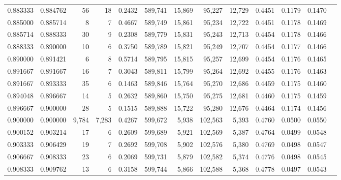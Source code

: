 \begin{tabular}{rrrrrrrrrrrrr}
0.883333 & 0.884762 &     56 &     18 &                                     0.2432 & 589,741 &  15,869 &  95,227 &  12,729 & 0.4451 & 0.1179 & 0.1470 \\
0.885000 & 0.885714 &      8 &      7 &                                     0.4667 & 589,749 &  15,861 &  95,234 &  12,722 & 0.4451 & 0.1178 & 0.1469 \\
0.885714 & 0.888333 &     30 &      9 &                                     0.2308 & 589,779 &  15,831 &  95,243 &  12,713 & 0.4454 & 0.1178 & 0.1466 \\
0.888333 & 0.890000 &     10 &      6 &                                     0.3750 & 589,789 &  15,821 &  95,249 &  12,707 & 0.4454 & 0.1177 & 0.1466 \\
0.890000 & 0.891421 &      6 &      8 &                                     0.5714 & 589,795 &  15,815 &  95,257 &  12,699 & 0.4454 & 0.1176 & 0.1465 \\
0.891667 & 0.891667 &     16 &      7 &                                     0.3043 & 589,811 &  15,799 &  95,264 &  12,692 & 0.4455 & 0.1176 & 0.1463 \\
0.891667 & 0.893333 &     35 &      6 &                                     0.1463 & 589,846 &  15,764 &  95,270 &  12,686 & 0.4459 & 0.1175 & 0.1460 \\
0.894048 & 0.896667 &     14 &      5 &                                     0.2632 & 589,860 &  15,750 &  95,275 &  12,681 & 0.4460 & 0.1175 & 0.1459 \\
0.896667 & 0.900000 &     28 &      5 &                                     0.1515 & 589,888 &  15,722 &  95,280 &  12,676 & 0.4464 & 0.1174 & 0.1456 \\
0.900000 & 0.900000 &  9,784 &  7,283 &                                     0.4267 & 599,672 &   5,938 & 102,563 &   5,393 & 0.4760 & 0.0500 & 0.0550 \\
0.900152 & 0.903214 &     17 &      6 &                                     0.2609 & 599,689 &   5,921 & 102,569 &   5,387 & 0.4764 & 0.0499 & 0.0548 \\
0.903333 & 0.906429 &     19 &      7 &                                     0.2692 & 599,708 &   5,902 & 102,576 &   5,380 & 0.4769 & 0.0498 & 0.0547 \\
0.906667 & 0.908333 &     23 &      6 &                                     0.2069 & 599,731 &   5,879 & 102,582 &   5,374 & 0.4776 & 0.0498 & 0.0545 \\
0.908333 & 0.909762 &     13 &      6 &                                     0.3158 & 599,744 &   5,866 & 102,588 &   5,368 & 0.4778 & 0.0497 & 0.0543 \\

\end{tabular}
